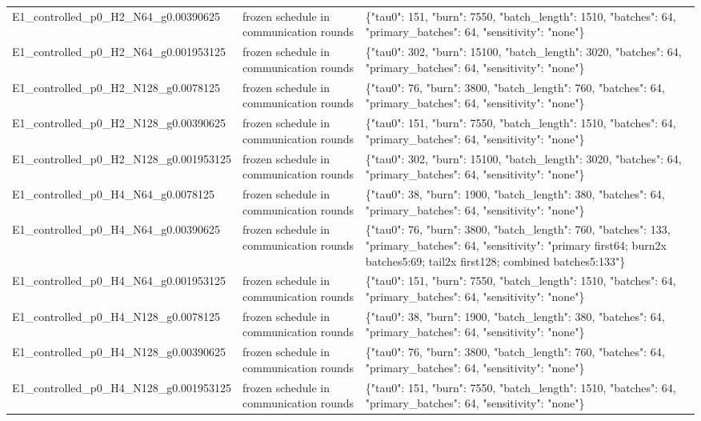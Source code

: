 \begin{tabular}{lll}
E1\_controlled\_p0\_H2\_N64\_g0.00390625 & frozen schedule in communication rounds & \{"tau0": 151, "burn": 7550, "batch\_length": 1510, "batches": 64, "primary\_batches": 64, "sensitivity": "none"\} \\
E1\_controlled\_p0\_H2\_N64\_g0.001953125 & frozen schedule in communication rounds & \{"tau0": 302, "burn": 15100, "batch\_length": 3020, "batches": 64, "primary\_batches": 64, "sensitivity": "none"\} \\
E1\_controlled\_p0\_H2\_N128\_g0.0078125 & frozen schedule in communication rounds & \{"tau0": 76, "burn": 3800, "batch\_length": 760, "batches": 64, "primary\_batches": 64, "sensitivity": "none"\} \\
E1\_controlled\_p0\_H2\_N128\_g0.00390625 & frozen schedule in communication rounds & \{"tau0": 151, "burn": 7550, "batch\_length": 1510, "batches": 64, "primary\_batches": 64, "sensitivity": "none"\} \\
E1\_controlled\_p0\_H2\_N128\_g0.001953125 & frozen schedule in communication rounds & \{"tau0": 302, "burn": 15100, "batch\_length": 3020, "batches": 64, "primary\_batches": 64, "sensitivity": "none"\} \\
E1\_controlled\_p0\_H4\_N64\_g0.0078125 & frozen schedule in communication rounds & \{"tau0": 38, "burn": 1900, "batch\_length": 380, "batches": 64, "primary\_batches": 64, "sensitivity": "none"\} \\
E1\_controlled\_p0\_H4\_N64\_g0.00390625 & frozen schedule in communication rounds & \{"tau0": 76, "burn": 3800, "batch\_length": 760, "batches": 133, "primary\_batches": 64, "sensitivity": "primary first64; burn2x batches5:69; tail2x first128; combined batches5:133"\} \\
E1\_controlled\_p0\_H4\_N64\_g0.001953125 & frozen schedule in communication rounds & \{"tau0": 151, "burn": 7550, "batch\_length": 1510, "batches": 64, "primary\_batches": 64, "sensitivity": "none"\} \\
E1\_controlled\_p0\_H4\_N128\_g0.0078125 & frozen schedule in communication rounds & \{"tau0": 38, "burn": 1900, "batch\_length": 380, "batches": 64, "primary\_batches": 64, "sensitivity": "none"\} \\
E1\_controlled\_p0\_H4\_N128\_g0.00390625 & frozen schedule in communication rounds & \{"tau0": 76, "burn": 3800, "batch\_length": 760, "batches": 64, "primary\_batches": 64, "sensitivity": "none"\} \\
E1\_controlled\_p0\_H4\_N128\_g0.001953125 & frozen schedule in communication rounds & \{"tau0": 151, "burn": 7550, "batch\_length": 1510, "batches": 64, "primary\_batches": 64, "sensitivity": "none"\} \\

\end{tabular}
